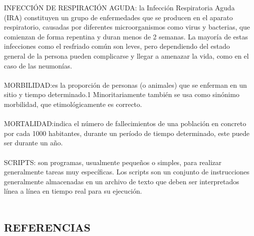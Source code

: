 \documentclass[a4paper,openright,12pt]{book}
\theoremstyle{definition}
\theoremstyle{remark}
\begin{document}
INFECCIÓN DE RESPIRACIÓN AGUDA: la Infección Respiratoria Aguda (IRA) constituyen un grupo de enfermedades que se producen en el aparato respiratorio, causadas por diferentes microorganismos como virus y bacterias, que comienzan de forma repentina y duran menos de 2 semanas.
La mayoría de estas infecciones como el resfriado común son leves, pero dependiendo del estado general de la persona pueden complicarse y llegar a amenazar la vida, como en el caso de las neumonías. \\\\
MORBILIDAD:es la proporción de personas (o animales) que se enferman en un sitio y tiempo determinado.1 Minoritariamente también se usa como sinónimo morbilidad, que etimológicamente es correcto.  \\\\
MORTALIDAD:indica el número de fallecimientos de una población en concreto por cada 1000 habitantes, durante un período de tiempo determinado, este puede ser durante un año. \\\\
SCRIPTS: son programas, usualmente pequeños o simples, para realizar generalmente tareas muy específicas. Los scripts son un conjunto de instrucciones generalmente almacenadas en un archivo de texto que deben ser interpretados línea a línea en tiempo real para su ejecución.\\\\
\clearpage

\begin{center}
 \chapter{REFERENCIAS}\label{cap.referencias}
\end{center}
\end{document}
